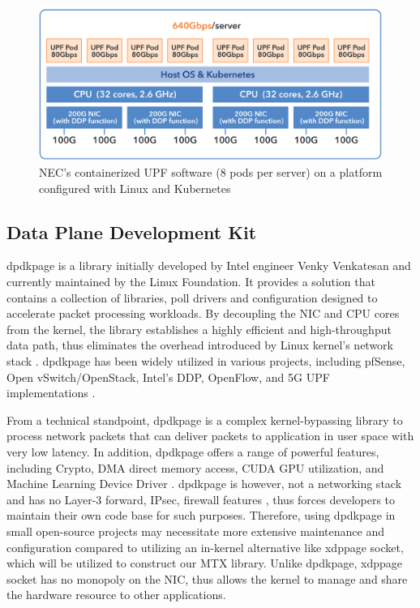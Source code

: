 \begin{figure}[H]
	\centering
	\includegraphics[width=1.0\textwidth]{resources/images/640_nec_upf_system.PNG}
	\caption{NEC's containerized UPF software (8 pods per server) on a platform configured with Linux and Kubernetes \cite{nec_upf_whitepaper}}
    \label{fig:related_work:640_nec_upf_system}
\end{figure}

\subsection{Data Plane Development Kit}
\ac{dpdkpage} is a library initially developed by Intel engineer Venky Venkatesan and currently maintained by the Linux Foundation. 
It provides a solution that contains a collection of libraries, poll drivers and configuration designed to accelerate packet processing workloads. 
By decoupling the NIC and CPU cores from the kernel, the library establishes a highly efficient and high-throughput data path, thus eliminates the overhead introduced by Linux kernel's network stack \cite{kourtis_enhancing_2015}. 
\ac{dpdkpage} has been widely utilized in various projects, including pfSense, Open vSwitch/OpenStack, Intel's DDP, OpenFlow, and 5G UPF implementations \cite{intel_ddp_ethernet_800}\cite{pongracz_removing_2013}\cite{zte_5g_core_upf_impl}\cite{nec_upf_whitepaper}. 

From a technical standpoint, \ac{dpdkpage} is a complex kernel-bypassing library to process network packets that can deliver packets to application in user space with very low latency.
In addition, \ac{dpdkpage} offers a range of powerful features, including Crypto, DMA direct memory access, CUDA GPU utilization, and Machine Learning Device Driver \cite{dpdk_guide_page}. 
\ac{dpdkpage} is however, not a networking stack and has no Layer-3 forward, IPsec, firewall features \cite{old_dpdk_page}, thus forces developers to maintain their own code base for such purposes.
Therefore, using \ac{dpdkpage} in small open-source projects may necessitate more extensive maintenance and configuration compared to utilizing an in-kernel alternative like \ac{xdppage} socket, which will be utilized to construct our MTX library.
Unlike \ac{dpdkpage}, \ac{xdppage} socket has no monopoly on the \ac{NIC}, thus allows the kernel to manage and share the hardware resource to other applications.

